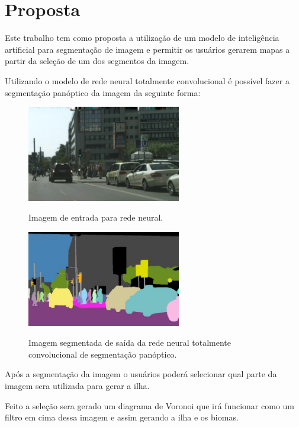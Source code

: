 \section{Proposta}

Este trabalho tem como proposta a utilização de um modelo de inteligência artificial para segmentação de imagem e permitir os usuários gerarem mapas a partir da seleção de um dos segmentos da imagem.

Utilizando o modelo de rede neural totalmente convolucional é possível fazer a segmentação panóptico da imagem da seguinte forma:

\begin{figure}[!ht]
	\centering
    \caption{Imagem de entrada para rede neural.}
	\includegraphics[width=0.6\textwidth]{figures/segmantations_1.png}
	\label{fig:segmantations_1}
\end{figure}

\begin{figure}[!ht]
	\centering
    \caption{Imagem segmentada de saída da rede neural totalmente convolucional de segmentação panóptico.}
	\includegraphics[width=0.6\textwidth]{figures/segmantations_2.png}
	\label{fig:segmantations_2}
\end{figure}

Após a segmentação da imagem o usuários poderá selecionar qual parte da imagem sera utilizada para gerar a ilha.

Feito a seleção sera gerado um diagrama de Voronoi que irá funcionar como um filtro em cima dessa imagem e assim gerando a ilha e os biomas.

